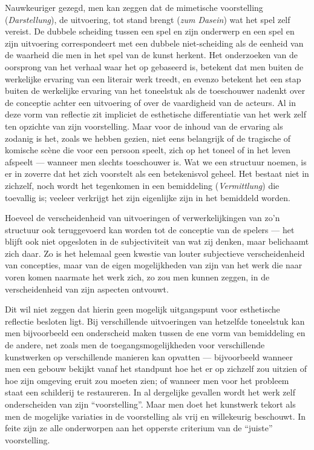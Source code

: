 Nauwkeuriger gezegd, men kan zeggen dat de mimetische voorstelling (\textit{Darstellung}), de uitvoering, tot stand brengt (\textit{zum Dasein}) wat het spel zelf vereist. De dubbele scheiding tussen een spel en zijn onderwerp en een spel en zijn uitvoering correspondeert met een dubbele niet-scheiding als de eenheid van de waarheid die men in het spel van de kunst herkent. Het onderzoeken van de oorsprong van het verhaal waar het op gebaseerd is, betekent dat men buiten de werkelijke ervaring van een literair werk treedt, en evenzo betekent het een stap buiten de werkelijke ervaring van het toneelstuk als de toeschouwer nadenkt over de conceptie achter een uitvoering of over de vaardigheid van de acteurs. Al in deze vorm van reflectie zit impliciet de esthetische differentiatie van het werk zelf ten opzichte van zijn voorstelling. Maar voor de inhoud van de ervaring als zodanig is het, zoals we hebben gezien, niet eens belangrijk of de tragische of komische scène die voor een persoon speelt, zich op het toneel of in het leven afspeelt — wanneer men slechts toeschouwer is. Wat we een structuur noemen, is er in zoverre dat het zich voorstelt als een betekenisvol geheel. Het bestaat niet in zichzelf, noch wordt het tegenkomen in een bemiddeling (\textit{Vermittlung}) die toevallig is; veeleer verkrijgt het zijn eigenlijke zijn in het bemiddeld worden.

Hoeveel de verscheidenheid van uitvoeringen of verwerkelijkingen van zo’n structuur ook teruggevoerd kan worden tot de conceptie van de spelers — het blijft ook niet opgesloten in de subjectiviteit van wat zij denken, maar belichaamt zich daar. Zo is het helemaal geen kwestie van louter subjectieve verscheidenheid van concepties, maar van de eigen mogelijkheden van zijn van het werk die naar voren komen naarmate het werk zich, zo zou men kunnen zeggen, in de verscheidenheid van zijn aspecten ontvouwt.

Dit wil niet zeggen dat hierin geen mogelijk uitgangspunt voor esthetische reflectie besloten ligt. Bij verschillende uitvoeringen van hetzelfde toneelstuk kan men bijvoorbeeld een onderscheid maken tussen de ene vorm van bemiddeling en de andere, net zoals men de toegangsmogelijkheden voor verschillende kunstwerken op verschillende manieren kan opvatten — bijvoorbeeld wanneer men een gebouw bekijkt vanaf het standpunt hoe het er op zichzelf zou uitzien of hoe zijn omgeving eruit zou moeten zien; of wanneer men voor het probleem staat een schilderij te restaureren. In al dergelijke gevallen wordt het werk zelf onderscheiden van zijn ``voorstelling''. Maar men doet het kunstwerk tekort als men de mogelijke variaties in de voorstelling als vrij en willekeurig beschouwt. In feite zijn ze alle onderworpen aan het opperste criterium van de ``juiste'' voorstelling.

